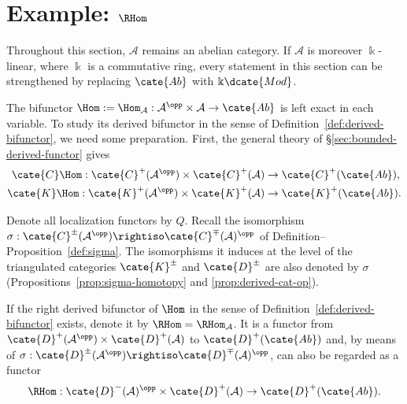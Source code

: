 
\section{Example: \texorpdfstring{$\RHom$}{RHom}}\label{sec:RHom}
\hypertarget{o014.aljabr2.chapter4.rhom}{ }

Throughout this section, $\mathcal{A}$ remains an abelian category. If
$\mathcal{A}$ is moreover $\Bbbk$-linear, where $\Bbbk$ is a commutative
ring, every statement in this section can be strengthened by replacing
$\cate{Ab}$ with $\Bbbk\dcate{Mod}$.

The bifunctor
$\Hom:=\Hom_{\mathcal{A}}:\mathcal{A}^{\opp}\times\mathcal{A}\to\cate{Ab}$
is left exact in each variable. To study its derived bifunctor in the sense of
Definition~\ref{def:derived-bifunctor}, we need some preparation. First, the
general theory of \S\ref{sec:bounded-derived-functor} gives
\begin{align*}
	\cate{C}\Hom: \cate{C}^+(\mathcal{A}^{\opp}) \times \cate{C}^+(\mathcal{A}) & \to \cate{C}^+(\cate{Ab}), \\
	\cate{K}\Hom: \cate{K}^+(\mathcal{A}^{\opp}) \times \cate{K}^+(\mathcal{A}) & \to \cate{K}^+(\cate{Ab}).
\end{align*}

Denote all localization functors by $Q$. Recall the isomorphism
$\sigma:\cate{C}^\pm(\mathcal{A}^{\opp})\rightiso
\cate{C}^{\mp}(\mathcal{A})^{\opp}$ of
Definition--Proposition~\ref{def:sigma}. The isomorphisms it induces at the
level of the triangulated categories $\cate{K}^\pm$ and $\cate{D}^\pm$ are
also denoted by $\sigma$ (Propositions~\ref{prop:sigma-homotopy} and
\ref{prop:derived-cat-op}).

\begin{definition}
	If the right derived bifunctor of $\Hom$ in the sense of
	Definition~\ref{def:derived-bifunctor} exists, denote it by
	$\RHom=\RHom_{\mathcal{A}}$. It is a functor from
	$\cate{D}^+(\mathcal{A}^{\opp})\times\cate{D}^+(\mathcal{A})$ to
	$\cate{D}^+(\cate{Ab})$ and, by means of
	$\sigma:\cate{D}^{\pm}(\mathcal{A}^{\opp})\rightiso
	\cate{D}^{\mp}(\mathcal{A})^{\opp}$, can also be regarded as a functor
	\[ \RHom: \cate{D}^-(\mathcal{A})^{\opp} \times \cate{D}^+(\mathcal{A}) \to \cate{D}^+(\cate{Ab}). \]
\end{definition}

